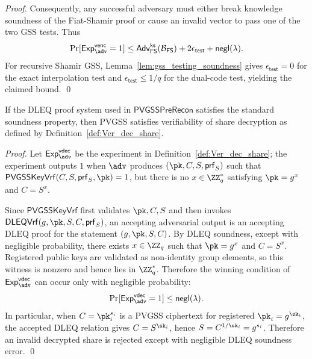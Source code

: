 \documentclass[runningheads]{llncs}
\newcommand{\pvgssPreRecon}{\mathsf{PVGSSPreRecon}}
\newcommand{\pvgssKeyVrf}{\mathsf{PVGSSKeyVrf}}
\newcommand{\dleqVrf}{\mathsf{DLEQVrf}}
\newcommand{\proofs}{\mathsf{prf}}
\begin{document}
\begin{proof}
Consequently, any successful adversary must either break knowledge soundness of the Fiat-Shamir proof or cause an invalid vector to pass one of the two GSS tests. Thus
\[
    \Pr[\mathsf{Exp}^{\mathsf{venc}}_{\adv}=1]
    \leq
    \mathsf{Adv}^{\mathsf{ks}}_{\mathsf{FS}}(\mathcal{B}_{\mathsf{FS}})
    +2\epsilon_{\mathsf{test}}
    +\mathsf{negl}(\lambda).
\]
For recursive Shamir GSS, Lemma~\ref{lem:gss_testing_soundness} gives \(\epsilon_{\mathsf{test}}=0\) for the exact interpolation test and \(\epsilon_{\mathsf{test}}\leq 1/q\) for the dual-code test, yielding the claimed bound.
\qed
\end{proof}

\begin{theorem}\label{theo:ver_share_dec}
    If the DLEQ proof system used in \(\pvgssPreRecon\) satisfies the standard soundness property, then PVGSS satisfies verifiability of share decryption as defined by Definition~\ref{def:Ver_dec_share}.
\end{theorem}
\begin{proof}
Let $\mathsf{Exp}^{\mathsf{vdec}}_{\adv}$ be the experiment in Definition~\ref{def:Ver_dec_share}; the experiment outputs $1$ when $\adv$ produces \((\pk,C,S,\proofs_S)\) such that \(\pvgssKeyVrf(C,S,\proofs_S,\pk)=1\), but there is no \(x\in\ZZ_q^*\) satisfying \(\pk=g^x\) and \(C=S^x\).

Since \(\pvgssKeyVrf\) first validates \(\pk,C,S\) and then invokes \(\dleqVrf(g,\pk,S,C,\proofs_S)\), an accepting adversarial output is an accepting DLEQ proof for the statement \((g,\pk,S,C)\). By DLEQ soundness, except with negligible probability, there exists \(x\in\ZZ_q\) such that \(\pk=g^x\) and \(C=S^x\). Registered public keys are validated as non-identity group elements, so this witness is nonzero and hence lies in \(\ZZ_q^*\). Therefore the winning condition of \(\mathsf{Exp}^{\mathsf{vdec}}_{\adv}\) can occur only with negligible probability:
\[
\Pr[\mathsf{Exp}^{\mathsf{vdec}}_{\adv}=1]
\leq
\mathsf{negl}(\lambda).
\]
In particular, when \(C=\pk_i^{s_i}\) is a PVGSS ciphertext for registered \(\pk_i=g^{\sk_i}\), the accepted DLEQ relation gives \(C=S^{\sk_i}\), hence \(S=C^{1/\sk_i}=g^{s_i}\). Therefore an invalid decrypted share is rejected except with negligible DLEQ soundness error.
\qed
\end{proof}
\end{document}
